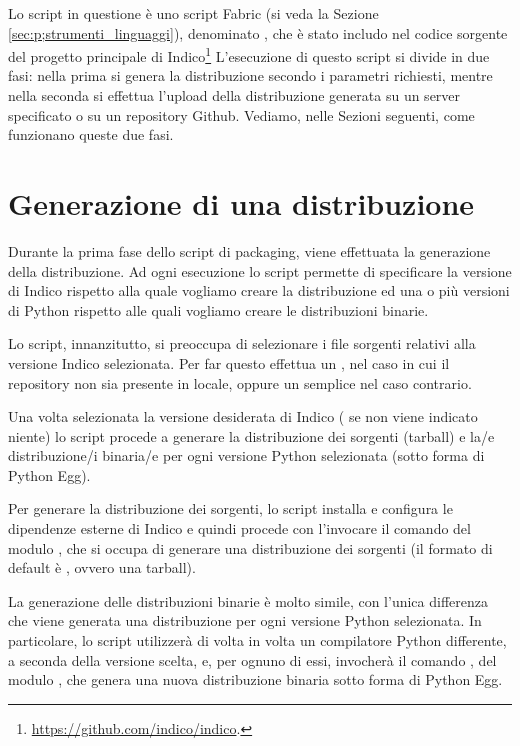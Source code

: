     Lo script in questione è uno script Fabric (si veda la Sezione \ref{sec:p;strumenti_linguaggi}), denominato , che è stato includo nel codice sorgente del progetto principale di Indico\footnote{\url{https://github.com/indico/indico}.}
    L'esecuzione di questo script si divide in due fasi: nella prima si genera la distribuzione secondo i parametri richiesti, mentre nella seconda si effettua l'upload della distribuzione generata su un server specificato o su un repository Github. Vediamo, nelle Sezioni seguenti, come funzionano queste due fasi.
    
    \section{Generazione di una distribuzione} \label{sec:dp;generazione_distribuzione}
    
        Durante la prima fase dello script di packaging, viene effettuata la generazione della distribuzione. Ad ogni esecuzione lo script permette di specificare la versione di Indico rispetto alla quale vogliamo creare la distribuzione ed una o più versioni di Python rispetto alle quali vogliamo creare le distribuzioni binarie.
        
        Lo script, innanzitutto, si preoccupa di selezionare i file sorgenti relativi alla versione Indico selezionata. Per far questo effettua un , nel caso in cui il repository non sia presente in locale, oppure un semplice  nel caso contrario.
        
        Una volta selezionata la versione desiderata di Indico ( se non viene indicato niente) lo script procede a generare la distribuzione dei sorgenti (tarball) e la/e distribuzione/i binaria/e per ogni versione Python selezionata (sotto forma di Python Egg).
        
        Per generare la distribuzione dei sorgenti, lo script installa e configura le dipendenze esterne di Indico e quindi procede con l'invocare il comando  del modulo  \cite{python:sdist}, che si occupa di generare una distribuzione dei sorgenti (il formato di default è , ovvero una tarball).
        
        La generazione delle distribuzioni binarie è molto simile, con l'unica differenza che viene generata una distribuzione per ogni versione Python selezionata. In particolare, lo script utilizzerà di volta in volta un compilatore Python differente, a seconda della versione scelta, e, per ognuno di essi, invocherà il comando , del modulo  \cite{python:bdist}, che genera una nuova distribuzione binaria sotto forma di Python Egg.
    
